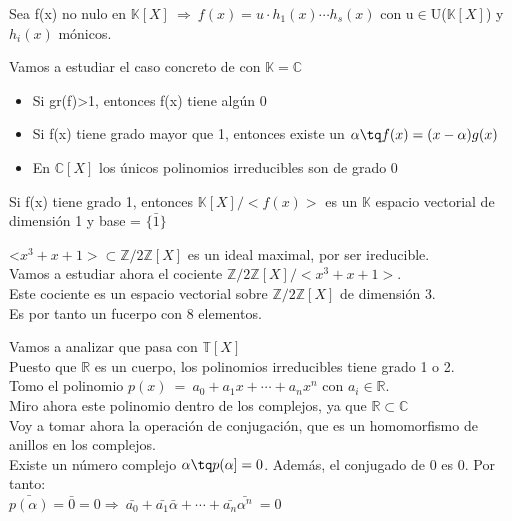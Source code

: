 \documentclass[nochap]{apuntes}
\begin{document}
\begin{theorem}
 Sea f(x) no nulo en $\mathbb{K}[X] \ \Rightarrow \ f(x)=u\cdot h_1(x) \cdots h_s(x)$  con u$\in$U($\mathbb{K}[X]$)  y $h_i(x)$  mónicos. 
\end{theorem}

\begin{example}
 Vamos a estudiar el caso concreto de con $\mathbb{K}=\mathbb{C}$\\
 \begin{itemize}
  \item Si gr(f)>1, entonces f(x) tiene algún 0
  \item Si f(x) tiene grado mayor que 1, entonces existe un $\alpha \tq f(x)=(x-\alpha)g(x)$
  \item En $\mathbb{C}[X]$  los únicos polinomios irreducibles son de grado 0
 \end{itemize}
\end{example}

\begin{lemma}
 Si f(x) tiene grado 1, entonces $\mathbb{K}[X]/<f(x)>$  es un $\mathbb{K}$  espacio vectorial de dimensión 1 y base = $\{\bar{1}\}$
\end{lemma}

\begin{example}
 <$x^3+x+1>\subset \mathbb{Z}/2\mathbb{Z}[X]$  es un ideal maximal, por ser ireducible.\\
 Vamos a estudiar ahora el cociente $\mathbb{Z}/2\mathbb{Z}[X]/<x^3+x+1>$.\\
 Este cociente es un espacio vectorial sobre $\mathbb{Z}/2\mathbb{Z}[X]$  de dimensión 3.\\
 Es por tanto un fucerpo con 8 elementos.
\end{example}

Vamos a analizar que pasa con $\mathbb{T}[X]$\\

Puesto que $\mathbb{R}$  es un cuerpo, los polinomios irreducibles tiene grado 1 o 2.\\
Tomo el polinomio $p(x) \ = \ a_0+a_1x+\cdots + a_n x^{n}$  con $a_i\in \mathbb{R}$.\\

Miro ahora este polinomio dentro de los complejos, ya que $\mathbb{R}\subset \mathbb{C}$\\
Voy a tomar ahora la operación de conjugación, que es un homomorfismo de anillos en los complejos.\\

Existe un número complejo $\alpha \tq p(\alpha]=0$. Además, el conjugado de 0 es 0. Por tanto:\\
$\bar{p(\alpha)}=\bar{0}=0 \Rightarrow \ \bar{a_0}+\bar{a_1}\bar{\alpha}+\cdots + \bar{a_n}\bar{\alpha^{n}} \ = 0$\\
\end{document}
